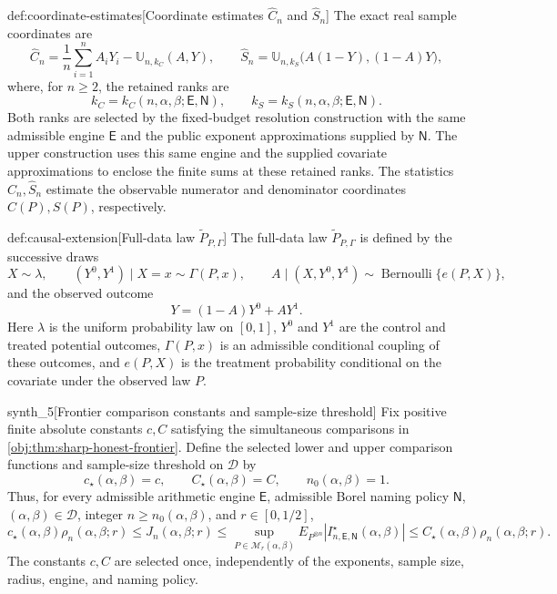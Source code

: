 \documentclass[11pt]{article}
\begin{document}
\begin{definitionv}{def:coordinate-estimates}[Coordinate estimates $\widehat C_n$ and $\widehat S_n$]
The exact real sample coordinates are
\[
\widehat C_n
=\frac1n\sum_{i=1}^n A_iY_i-\mathbb U_{n,k_C}(A,Y),\qquad
\widehat S_n
=\mathbb U_{n,k_S}\bigl(A(1-Y),(1-A)Y\bigr),
\]
where, for \(n\ge2\), the retained ranks are
\[
k_C=k_C(n,\alpha,\beta;\mathsf E,\mathsf N),\qquad
k_S=k_S(n,\alpha,\beta;\mathsf E,\mathsf N).
\]
Both ranks are selected by the fixed-budget resolution construction with the same admissible engine \(\mathsf E\) and the public exponent approximations supplied by \(\mathsf N\). The upper construction uses this same engine and the supplied covariate approximations to enclose the finite sums at these retained ranks. The statistics \(\widehat C_n,\widehat S_n\) estimate the observable numerator and denominator coordinates \(C(P),S(P)\), respectively.
\end{definitionv}

\begin{definitionv}{def:causal-extension}[Full-data law $\widetilde P_{P,\Gamma}$]
The full-data law \(\widetilde P_{P,\Gamma}\) is defined by the successive draws
\[
X\sim\lambda,\qquad
(Y^0,Y^1)\mid X=x\sim\Gamma(P,x),\qquad
A\mid(X,Y^0,Y^1)\sim\operatorname{Bernoulli}\{e(P,X)\},
\]
and the observed outcome
\[
Y=(1-A)Y^0+AY^1.
\]
Here \(\lambda\) is the uniform probability law on \([0,1]\), \(Y^0\) and \(Y^1\) are the control and treated potential outcomes, \(\Gamma(P,x)\) is an admissible conditional coupling of these outcomes, and \(e(P,X)\) is the treatment probability conditional on the covariate under the observed law \(P\).
\end{definitionv}

\begin{definitionv}{synth_5}[Frontier comparison constants and sample-size threshold]
Fix positive finite absolute constants \(c,C\) satisfying the simultaneous comparisons in \cref{obj:thm:sharp-honest-frontier}. Define the selected lower and upper comparison functions and sample-size threshold on \(\mathcal D\) by
\[
c_\star(\alpha,\beta)=c,\qquad
C_\star(\alpha,\beta)=C,\qquad
n_0(\alpha,\beta)=1.
\]
Thus, for every admissible arithmetic engine \(\mathsf E\), admissible Borel naming policy \(\mathsf N\), \((\alpha,\beta)\in\mathcal D\), integer \(n\ge n_0(\alpha,\beta)\), and \(r\in[0,1/2]\),
\[
c_\star(\alpha,\beta)\rho_n(\alpha,\beta;r)
\le J_n(\alpha,\beta;r)
\le
\sup_{P\in\mathcal M_r(\alpha,\beta)}
E_{P^{\otimes n}}\!
\left|I^\star_{n,\mathsf E,\mathsf N}(\alpha,\beta)\right|
\le C_\star(\alpha,\beta)\rho_n(\alpha,\beta;r).
\]
The constants \(c,C\) are selected once, independently of the exponents, sample size, radius, engine, and naming policy.
\end{definitionv}
\end{document}
